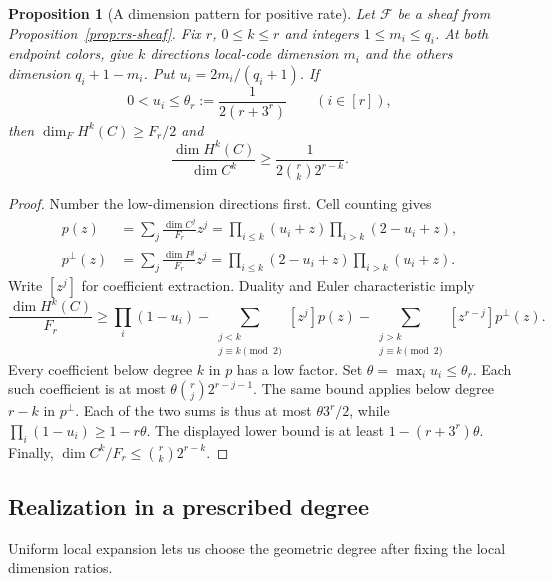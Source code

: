 \documentclass[11pt,letterpaper]{article}
\renewcommand{\le}{\leqslant}
\renewcommand{\ge}{\geqslant}
\newtheorem{proposition}[theorem]{Proposition}
\theoremstyle{definition}
\theoremstyle{remark}
\newcommand{\cF}{\mathcal F}
\begin{document}
\begin{proposition}[A dimension pattern for positive rate]\label{prop:rate}
Let $\cF$ be a sheaf from Proposition~\ref{prop:rs-sheaf}.
Fix $r$, $0\le k\le r$ and integers $1\le m_i\le q_i$.
At both endpoint colors, give $k$
directions local-code dimension $m_i$ and the others dimension
$q_i+1-m_i$. Put $u_i=2m_i/(q_i+1)$. If
\[
 0<u_i\le\theta_r:=\frac1{2(r+3^r)}\qquad(i\in[r]),
\]
then $\dim_F H^k(C)\ge F_r/2$ and
\[
 \frac{\dim H^k(C)}{\dim C^k}
 \ge\frac1{2\binom rk2^{r-k}}.
\]
\end{proposition}
\begin{proof}
Number the low-dimension directions first. Cell counting gives
\begin{align*}
 p(z)&=\sum_j\frac{\dim C^j}{F_r}z^j
       =\prod_{i\le k}(u_i+z)\prod_{i>k}(2-u_i+z),\\
 p^\perp(z)&=\sum_j\frac{\dim P^j}{F_r}z^j
       =\prod_{i\le k}(2-u_i+z)\prod_{i>k}(u_i+z).
\end{align*}
Write $[z^j]$ for coefficient extraction. Duality and Euler
characteristic imply
\[
 \frac{\dim H^k(C)}{F_r}\ge\prod_i(1-u_i)
 -\sum_{\substack{j<k\\j\equiv k\pmod2}}[z^j]p(z)
 -\sum_{\substack{j>k\\j\equiv k\pmod2}}[z^{r-j}]p^\perp(z).
\]
Every coefficient below degree $k$ in $p$ has a low factor.
Set $\theta=\max_i u_i\le\theta_r$. Each such coefficient is at most
$\theta\binom rj2^{r-j-1}$. The same bound applies below degree
$r-k$ in $p^\perp$. Each of the two sums is thus at most
$\theta3^r/2$, while $\prod_i(1-u_i)\ge1-r\theta$.
The displayed lower bound is at least $1-(r+3^r)\theta$.
Finally, $\dim C^k/F_r\le\binom rk2^{r-k}$.
\end{proof}

\subsection{Realization in a prescribed degree}
\label{sec:prescribed-degree}

Uniform local expansion lets us choose the geometric degree after
fixing the local dimension ratios.
\end{document}
